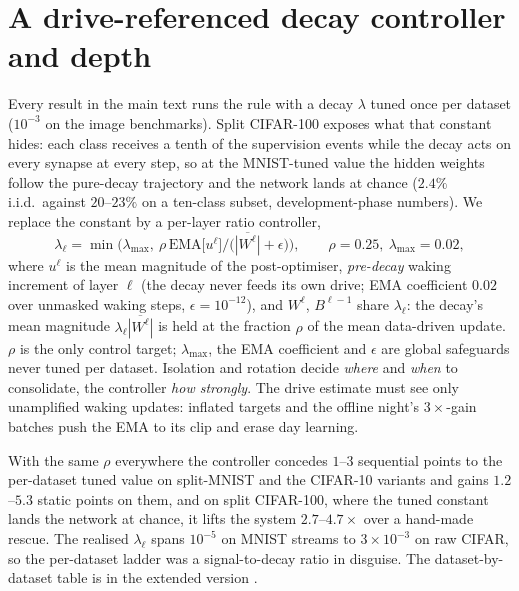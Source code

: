\documentclass{article}
\begin{document}
\section{A drive-referenced decay controller and depth}
\label{app:controller}
Every result in the main text runs the rule with a decay $\lambda$ tuned once per dataset
($10^{-3}$ on the image benchmarks). Split CIFAR-100 exposes what that constant hides: each
class receives a tenth of the supervision events while the decay acts on every synapse at
every step, so at the MNIST-tuned value the hidden weights follow the pure-decay trajectory
and the network lands at chance ($2.4\%$ i.i.d.\ against $20$--$23\%$ on a ten-class subset,
development-phase numbers). We replace the constant by a per-layer ratio controller,
\begin{equation}
\lambda_\ell=\min\!\Big(\lambda_{\max},\ \rho\,\mathrm{EMA}\big[u^\ell\big]\big/\big(\overline{|W^\ell|}+\epsilon\big)\Big),\qquad \rho=0.25,\ \lambda_{\max}=0.02,
\label{eq:controller}
\end{equation}
where $u^\ell$ is the mean magnitude of the post-optimiser, \emph{pre-decay} waking increment
of layer $\ell$ (the decay never feeds its own drive; EMA coefficient $0.02$ over unmasked
waking steps, $\epsilon=10^{-12}$), and $W^\ell$, $B^{\ell-1}$ share $\lambda_\ell$: the decay's
mean magnitude $\lambda_\ell\overline{|W^\ell|}$ is held at the fraction $\rho$ of the mean
data-driven update. $\rho$ is the only control target; $\lambda_{\max}$, the EMA coefficient
and $\epsilon$ are global safeguards never tuned per dataset. Isolation and rotation decide
\emph{where} and \emph{when} to consolidate, the controller \emph{how strongly}. The drive
estimate must see only unamplified waking updates: inflated targets and the offline night's
$3\times$-gain batches push the EMA to its clip and erase day learning.

With the same $\rho$ everywhere the controller concedes $1$--$3$ sequential points to the
per-dataset tuned value on split-MNIST and the CIFAR-10 variants and gains $1.2$--$5.3$
static points on them, and on split CIFAR-100, where the tuned constant lands the network at
chance, it lifts the system $2.7$--$4.7\times$ over a hand-made rescue. The realised
$\lambda_\ell$ spans $10^{-5}$ on MNIST streams to $3\times10^{-3}$ on raw CIFAR, so the
per-dataset ladder was a signal-to-decay ratio in disguise. The dataset-by-dataset table is
in the extended version \citep{extended}.
\end{document}
